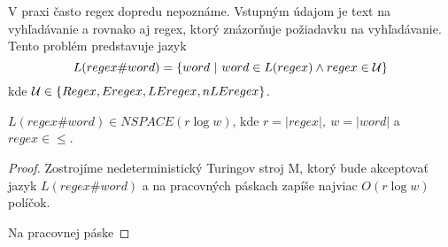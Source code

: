 V praxi často regex dopredu nepoznáme. Vstupným údajom je text na vyhľadávanie a rovnako aj regex, ktorý znázorňuje požiadavku na vyhľadávanie. Tento problém predstavuje jazyk $$L(regex\#word) = \lbrace word~|~word \in L(regex) \wedge regex \in \cal U \rbrace$$
kde ${\cal U} \in \lbrace Regex ,Eregex ,LEregex ,nLEregex \rbrace$.

\begin{veta}
$L(regex\#word) \in NSPACE(r \log w)$, kde $r = |regex|,~w = |word|$ a $regex \in \le$.
\end{veta}
\begin{proof}
\TODO
Zostrojíme nedeterministický Turingov stroj M, ktorý bude akceptovať jazyk $L(regex\#word)$ a na pracovných páskach zapíše najviac $O(r\log w)$ políčok.

Na pracovnej páske 
\end{proof}

